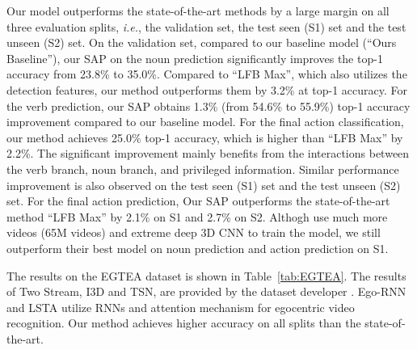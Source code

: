 \documentclass[letterpaper]{article} \usepackage{aaai20}  \usepackage{times}  \usepackage{helvet} \usepackage{courier}  \usepackage[hyphens]{url}  \usepackage{graphicx} \urlstyle{rm} \def\UrlFont{\rm}  \usepackage{graphicx}  \frenchspacing  \setlength{\pdfpagewidth}{8.5in}  \setlength{\pdfpageheight}{11in}  \usepackage{amsfonts,amssymb}
\def\ie{\emph{i.e.}}
\begin{document}
Our model outperforms the state-of-the-art methods by a large margin on all three evaluation splits, \ie, the validation set, the test seen (S1) set and the test unseen (S2) set. 
On the validation set, compared to our baseline model (``Ours Baseline''), our SAP on the noun prediction significantly improves the top-1 accuracy from 23.8\% to 35.0\%. 
Compared to ``LFB Max'', which also utilizes the detection features, our method outperforms them by 3.2\% at top-1 accuracy. 
For the verb prediction, our SAP obtains 1.3\% (from 54.6\% to 55.9\%) top-1 accuracy improvement compared to our baseline model. 
For the final action classification, our method achieves 25.0\% top-1 accuracy, which is higher than ``LFB Max'' by 2.2\%. The significant improvement mainly benefits from the interactions between the verb branch, noun branch, and privileged information.
Similar performance improvement is also observed on the test seen (S1) set and the test unseen (S2) set. 
For the final action prediction, Our SAP outperforms the state-of-the-art method ``LFB Max'' by 2.1\% on S1 and 2.7\% on S2.
Althogh\cite{Ghadiyaram_2019_CVPR} use much more videos (65M videos) and extreme deep 3D CNN to train the model, we still outperform their best model on noun prediction and action prediction on S1. 

The results on the EGTEA dataset is shown in Table~\ref{tab:EGTEA}. The results of Two Stream, I3D and TSN, are provided by the dataset developer \cite{li2018eye}. Ego-RNN \cite{sudhakaran2018attention} and LSTA \cite{Sudhakaran_2019_CVPR} utilize RNNs and attention mechanism for egocentric video recognition. Our method achieves higher accuracy on all splits than the state-of-the-art. 
\end{document}
